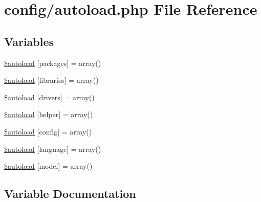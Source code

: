 \hypertarget{application_2config_2autoload_8php}{}\section{config/autoload.php File Reference}
\label{application_2config_2autoload_8php}
\subsection*{Variables}
\begin{DoxyCompactItemize}
\item 
\mbox{\hyperlink{application_2config_2autoload_8php_ac5678ca15b21f0795b8466b7583849bf}{\$autoload}} \mbox{[}\textquotesingle{}packages\textquotesingle{}\mbox{]} = array()
\item 
\mbox{\hyperlink{application_2config_2autoload_8php_ad655849207db869167a82844e38957e3}{\$autoload}} \mbox{[}\textquotesingle{}libraries\textquotesingle{}\mbox{]} = array()
\item 
\mbox{\hyperlink{application_2config_2autoload_8php_a7e17f3dd459c588be7378c00952567f0}{\$autoload}} \mbox{[}\textquotesingle{}drivers\textquotesingle{}\mbox{]} = array()
\item 
\mbox{\hyperlink{application_2config_2autoload_8php_ad7a21d85fc61c2b084281ac5dc778805}{\$autoload}} \mbox{[}\textquotesingle{}helper\textquotesingle{}\mbox{]} = array()
\item 
\mbox{\hyperlink{application_2config_2autoload_8php_a6731e31354d64020493daeeef0fe6b73}{\$autoload}} \mbox{[}\textquotesingle{}config\textquotesingle{}\mbox{]} = array()
\item 
\mbox{\hyperlink{application_2config_2autoload_8php_a5d6de8162b7a7ef37ac121ab70b1cd87}{\$autoload}} \mbox{[}\textquotesingle{}language\textquotesingle{}\mbox{]} = array()
\item 
\mbox{\hyperlink{application_2config_2autoload_8php_aa7f002455915c322bf25092dff0d419b}{\$autoload}} \mbox{[}\textquotesingle{}model\textquotesingle{}\mbox{]} = array()
\end{DoxyCompactItemize}


\subsection{Variable Documentation}
\mbox{\label{application_2config_2autoload_8php_ac5678ca15b21f0795b8466b7583849bf}} 
